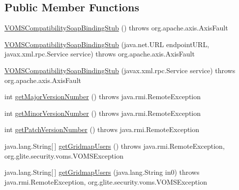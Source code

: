 \subsection*{Public Member Functions}
\begin{DoxyCompactItemize}
\item 
\hyperlink{classorg_1_1glite_1_1security_1_1voms_1_1service_1_1compatibility_1_1VOMSCompatibilitySoapBindingStub_a7ad0696e82588cfa3d815c9a7a219456}{VOMSCompatibilitySoapBindingStub} ()  throws org.apache.axis.AxisFault 
\item 
\hyperlink{classorg_1_1glite_1_1security_1_1voms_1_1service_1_1compatibility_1_1VOMSCompatibilitySoapBindingStub_ab53c71b22cb5490685648145c06ced84}{VOMSCompatibilitySoapBindingStub} (java.net.URL endpointURL, javax.xml.rpc.Service service)  throws org.apache.axis.AxisFault 
\item 
\hyperlink{classorg_1_1glite_1_1security_1_1voms_1_1service_1_1compatibility_1_1VOMSCompatibilitySoapBindingStub_a39c8c2d8c330fdf85e1e6d808394f966}{VOMSCompatibilitySoapBindingStub} (javax.xml.rpc.Service service)  throws org.apache.axis.AxisFault 
\item 
int \hyperlink{classorg_1_1glite_1_1security_1_1voms_1_1service_1_1compatibility_1_1VOMSCompatibilitySoapBindingStub_a10837c9efa6635901e1fa59701637083}{getMajorVersionNumber} ()  throws java.rmi.RemoteException 
\item 
int \hyperlink{classorg_1_1glite_1_1security_1_1voms_1_1service_1_1compatibility_1_1VOMSCompatibilitySoapBindingStub_a424cccecd758a3ba905779655936fea2}{getMinorVersionNumber} ()  throws java.rmi.RemoteException 
\item 
int \hyperlink{classorg_1_1glite_1_1security_1_1voms_1_1service_1_1compatibility_1_1VOMSCompatibilitySoapBindingStub_a27c2743de39197037aa3cbe5c38a7d2f}{getPatchVersionNumber} ()  throws java.rmi.RemoteException 
\item 
java.lang.String\mbox{[}$\,$\mbox{]} \hyperlink{classorg_1_1glite_1_1security_1_1voms_1_1service_1_1compatibility_1_1VOMSCompatibilitySoapBindingStub_a748de742b28b6213f66f39a54be9592a}{getGridmapUsers} ()  throws java.rmi.RemoteException, org.glite.security.voms.VOMSException 
\item 
java.lang.String\mbox{[}$\,$\mbox{]} \hyperlink{classorg_1_1glite_1_1security_1_1voms_1_1service_1_1compatibility_1_1VOMSCompatibilitySoapBindingStub_ac35b70ab87497046177e90d60814e9e9}{getGridmapUsers} (java.lang.String in0)  throws java.rmi.RemoteException, org.glite.security.voms.VOMSException 
\end{DoxyCompactItemize}
